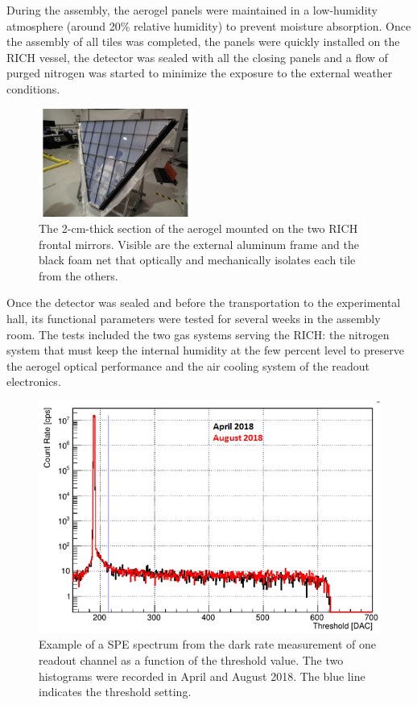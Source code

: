 \documentclass[5p,times,twocolumn]{elsarticle}
\begin{document}
During the assembly, the aerogel panels were maintained in a low-humidity atmosphere (around 20\% relative humidity)
to prevent moisture absorption. Once the assembly of all tiles was completed, the panels were quickly installed on
the RICH vessel, the detector was sealed with all the closing panels and a flow of purged nitrogen was started to
minimize the exposure to the external weather conditions.

\begin{figure}
\begin{center}
\includegraphics[width=0.45\textwidth]{aerogel_bottom.pdf}
\caption{The 2-cm-thick section of the aerogel mounted on the two RICH frontal mirrors. Visible are the
  external aluminum frame and the black foam net that optically and mechanically isolates each tile from the others.}
\label{Fig:AeroB1}
\end{center}
\end{figure}

Once the detector was sealed and before the transportation to the experimental hall, its functional parameters were
tested for several weeks in the assembly room. The tests included the two gas systems serving the RICH: the nitrogen
system that must keep the internal humidity at the few percent level to preserve the aerogel optical performance and
the air cooling system of the readout electronics.

\begin{figure}[t]
\begin{center}
\includegraphics[width=1.0\columnwidth]{SPEdark.png}
\end{center}
\caption{Example of a SPE spectrum from the dark rate measurement of one readout channel as a function of the
  threshold value. The two histograms were recorded in April and August 2018. The blue line indicates the threshold
  setting.}
\label{fig:SPEdark}
\end{figure}
\end{document}
